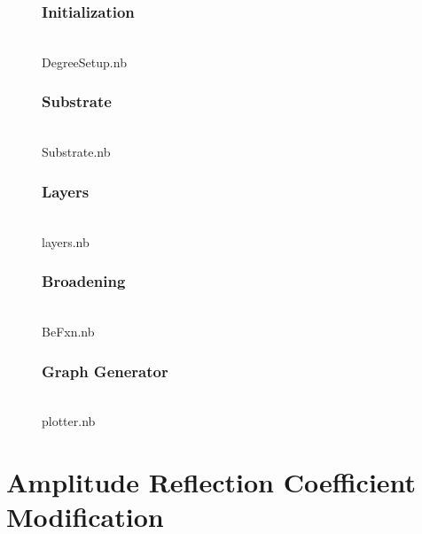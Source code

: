 \begin{figure}[h]
\subsection{Initialization}
\\DegreeSetup.nb
\end{figure}

\begin{figure}[h]
\subsection{Substrate}
\\Substrate.nb
\end{figure}

\begin{figure}[h]
\subsection{Layers}
\\layers.nb
\end{figure}

\begin{figure}[h]
\subsection{Broadening}
\\BeFxn.nb
\end{figure}

\begin{figure}[h]
\subsection{Graph Generator}
\\plotter.nb
\end{figure}



	\chapter{Amplitude Reflection Coefficient Modification}\label{ARCM}

